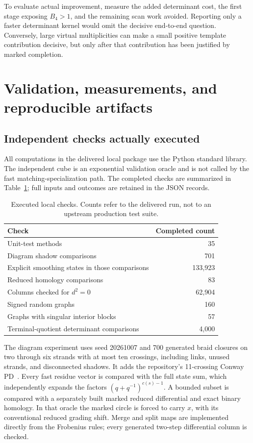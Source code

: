 \documentclass[11pt]{article}
\theoremstyle{definition}
\theoremstyle{remark}
\begin{document}
To evaluate actual improvement, measure the added determinant cost, the
first stage exposing $B_4>1$, and the remaining scan work avoided. Reporting
only a faster determinant kernel would omit the decisive end-to-end
question. Conversely, large virtual multiplicities can make a small
positive template contribution decisive, but only after that contribution
has been justified by marked completion.

\section{Validation, measurements, and reproducible artifacts}
\label{sec:validation}

\subsection{Independent checks actually executed}
All computations in the delivered local package use the Python standard
library. The independent cube is an exponential validation oracle and is
not called by the fast matching-specialization path. The completed checks
are summarized in Table~\ref{tab:checks}; full inputs and outcomes are
retained in the JSON records.

\begin{table}[ht]
\centering
\begin{tabular}{lr}
\toprule
Check & Completed count\\
\midrule
Unit-test methods & 35\\
Diagram shadow comparisons & 701\\
Explicit smoothing states in those comparisons & 133,923\\
Reduced homology comparisons & 83\\
Columns checked for $d^2=0$ & 62,904\\
Signed random graphs & 160\\
Graphs with singular interior blocks & 57\\
Terminal-quotient determinant comparisons & 4,000\\
\bottomrule
\end{tabular}
\caption{Executed local checks. Counts refer to the delivered run, not to
an upstream production test suite.}\label{tab:checks}
\end{table}

The diagram experiment uses seed 20261007 and 700 generated braid closures
on two through six strands with at most ten crossings, including links,
unused strands, and disconnected shadows. It adds the repository's
11-crossing Conway PD~\cite{conwayinput}. Every fast residue vector is compared with the full
state sum, which independently expands the factors
$(q+q^{-1})^{c(s)-1}$. A bounded subset is compared with a separately built
marked reduced differential and exact binary homology. In that oracle the
marked circle is forced to carry $x$, with its conventional reduced grading
shift. Merge and split maps are implemented directly from the Frobenius
rules; every generated two-step differential column is checked.
\end{document}
